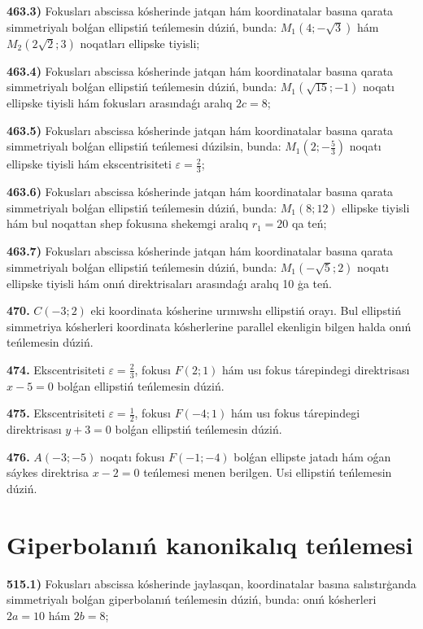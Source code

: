 \textbf{463.3)} Fokusları abscissa kósherinde jatqan hám koordinatalar basına qarata simmetriyalı bolǵan ellipstiń teńlemesin dúziń, bunda: $M_1 (4;-\sqrt{3}) $ hám $M_2 (2 \sqrt{2}; 3)$ noqatları ellipske tiyisli;

\textbf{463.4)} Fokusları abscissa kósherinde jatqan hám koordinatalar basına qarata simmetriyalı bolǵan ellipstiń teńlemesin dúziń, bunda: $M_1 (\sqrt{15};-1) $ noqatı ellipske tiyisli hám fokusları arasındaǵı aralıq $2 c=8$;

\textbf{463.5)} Fokusları abscissa kósherinde jatqan hám koordinatalar basına qarata simmetriyalı bolǵan ellipstiń teńlemesi dúzilsin, bunda: $M_1 \left(2;-\frac{5}{3}\right) $ noqatı ellipske tiyisli hám ekscentrisiteti $\varepsilon=\frac{2}{3}$;

\textbf{463.6)} Fokusları abscissa kósherinde jatqan hám koordinatalar basına qarata simmetriyalı bolǵan ellipstiń teńlemesin dúziń, bunda: $M_1 (8; 12) $ ellipske tiyisli hám bul noqattan shep fokusına shekemgi aralıq $r_1=20$ qa teń;

\textbf{463.7)} Fokusları abscissa kósherinde jatqan hám koordinatalar basına qarata simmetriyalı bolǵan ellipstiń teńlemesin dúziń, bunda: $M_1 (-\sqrt{5}; 2)$ noqatı ellipske tiyisli hám onıń direktrisaları arasındaǵı aralıq 10 ģa teń.

\textbf {470.} $C (-3; 2)$ eki koordinata kósherine urınıwshı ellipstiń orayı. Bul ellipstiń simmetriya kósherleri koordinata kósherlerine parallel ekenligin bilgen halda onıń teńlemesin dúziń.

\textbf {474.} Ekscentrisiteti $\varepsilon=\frac{2}{3}$, fokusı $F (2; 1) $ hám usı fokus tárepindegi direktrisası $x-5=0$ bolǵan ellipstiń teńlemesin dúziń.

\textbf {475.} Ekscentrisiteti $\varepsilon=\frac{1}{2}$, fokusı $F (-4; 1) $ hám usı fokus tárepindegi direktrisası $y+3=0$ bolǵan ellipstiń teńlemesin dúziń.

\textbf {476.} $A (-3;-5) $ noqatı fokusı $F (-1;-4) $ bolǵan ellipste jatadı hám oǵan sáykes direktrisa $x-2=0$ teńlemesi menen berilgen. Usi ellipstiń teńlemesin dúziń.



\section{Giperbolanıń kanonikalıq teńlemesi}



\textbf{515.1)} Fokusları abscissa kósherinde jaylasqan, koordinatalar basına salıstırģanda simmetriyalı bolǵan giperbolanıń teńlemesin dúziń, bunda: onıń kósherleri $2 a=10$ hám $2 b=8$;

